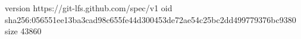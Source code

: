 version https://git-lfs.github.com/spec/v1
oid sha256:056551ee13ba3cad98c655fe44d300453de72ae54c25bc2dd499779376bc9380
size 43860
